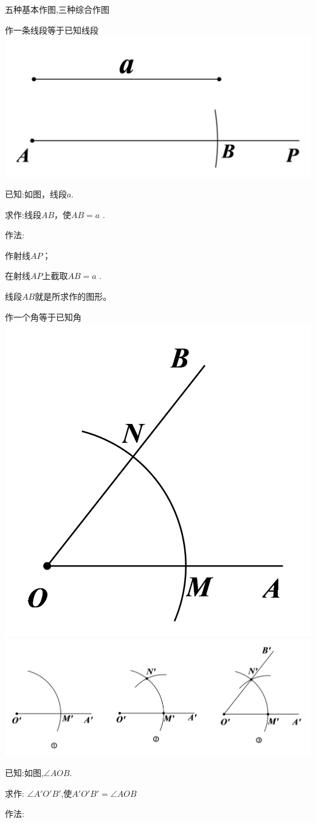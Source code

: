 \documentclass[cn,blue,12pt]{elegantbook}
\begin{document}
\begin{zsyd}
\item 五种基本作图,三种综合作图
    \begin{zsyd}
    \item 作一条线段等于已知线段\\
        \includegraphics[width=0.4\linewidth]{pic/20200515005.png}\\
        \begin{zsyd}
        \item 已知:如图，线段\(a\).
        \item 求作:线段\(AB\)，使\(AB = a\) .
        \item 作法:
            \begin{zsyd}
            \item 作射线\(AP\)；
            \item 在射线\(AP\)上截取\(AB=a\) .
            \item 线段\(AB\)就是所求作的图形\(。\)
            \end{zsyd}
        \end{zsyd}
    \item 作一个角等于已知角\\
        \includegraphics[width=0.2\linewidth]{pic/20200515015.png}
        \includegraphics[width=0.6\linewidth]{pic/20200515008.png}\\
        \begin{zsyd}
        \item 已知:如图,\(\angle AOB\).
        \item 求作: \(\angle A'O'B'\),使\(A'O'B'= \angle AOB\)
        \item 作法:

\end{zsyd}
\end{zsyd}
\end{zsyd}
\end{document}
